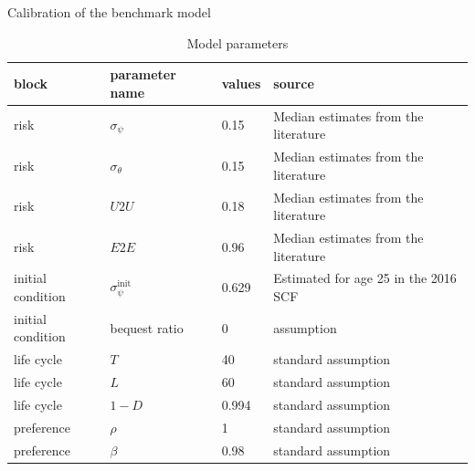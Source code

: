 \documentclass{beamer}
\begin{document}
\begin{frame}{Calibration of the benchmark model}
	\label{appendix:calibration}	
	\begin{table}[p]
		\centering
		\caption{Model parameters}
		\label{tab:calibration}
		\begin{adjustbox}{width={0.8\textwidth}}
			\begin{tabular}{llll}
				\hline 
				
				block             & parameter name              & values & source                               \\
				\hline 
				
				risk              & $\sigma_\psi$               & 0.15   & Median estimates from the literature \\
				risk              & $\sigma_\theta$             & 0.15    & Median estimates from the literature \\
				risk              & $U2U$                       & 0.18   & Median estimates from the literature \\
				risk              & $E2E$                       & 0.96   & Median estimates from the literature \\
				\hline 
				
				initial condition & $\sigma_\psi^{\text{init}}$ & 0.629  & Estimated for age 25 in the 2016 SCF \\
				initial condition & bequest ratio               & 0      & assumption                           \\
				\hline 
				
				life cycle        & $T$                         & 40     & standard assumption                  \\
				life cycle        & $L$                         & 60     & standard assumption                  \\
				life cycle        & $1-D$                       & 0.994  & standard assumption                  \\
				\hline 
				
				preference        & $\rho$                      & 1      & standard assumption                  \\
				preference        & $\beta$                     & 0.98   & standard assumption                  \\
				\hline 
				

\end{tabular}
\end{adjustbox}
\end{table}
\end{frame}
\end{document}
